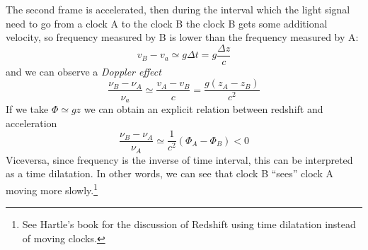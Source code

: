\documentclass[../main/main.tex]{subfiles}
\begin{document}
The second frame is accelerated, then during the interval which the light signal need to go from a clock A to the clock B the clock B gets some additional velocity, so frequency measured by B is lower than the frequency measured by A:
\[v_B-v_a\simeq g\Delta t=g\frac{\Delta z}{c}\]
and we can observe a \emph{Doppler effect} 
\[\frac{\nu_B-\nu_A}{\nu_a}\simeq\frac{v_A-v_B}{c}=\frac{g(z_A-z_B)}{c^2}\]
If we take $\Phi\simeq gz$ we can obtain an explicit relation between redshift and acceleration
\[\frac{\nu_B-\nu_A}{\nu_A}\simeq\frac1{c^2}(\Phi_A-\Phi_B)<0\]
Viceversa, since frequency is the inverse of time interval, this can be interpreted as a time dilatation.
In other words, we can see that clock B ``sees'' clock A moving more slowly.\footnote{See Hartle's book for the discussion of Redshift using time dilatation instead of moving clocks.}
\end{document}
